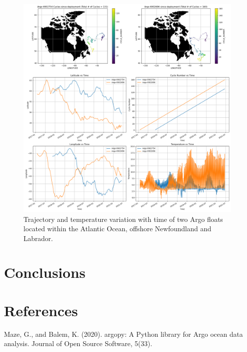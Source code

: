 \documentclass{article}
\begin{document}
\begin{figure}[!ht]
\includegraphics[width=\textwidth,height=\textheight,keepaspectratio]{argo_trajectory.png}
\caption{Trajectory and temperature variation with time of two Argo floats located within the Atlantic Ocean, offshore Newfoundland and Labrador.}
\end{figure}
 
 

\section{Conclusions}

\section{References}

Maze, G., and Balem, K. (2020). argopy: A Python library for Argo ocean data analysis. Journal of Open Source Software, 5(33).
\end{document}
